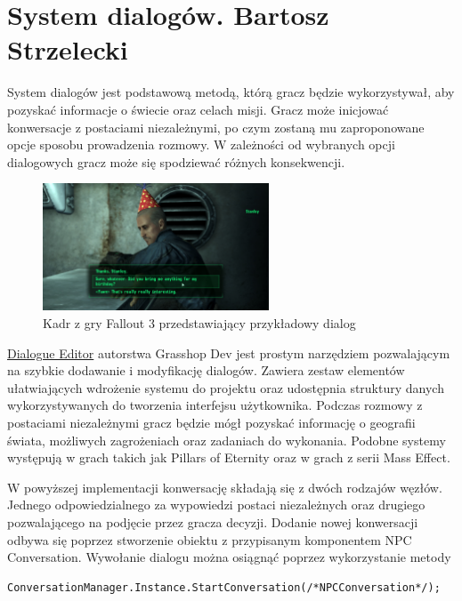 \section{System dialogów. Bartosz Strzelecki}

System dialogów jest podstawową metodą, którą gracz będzie wykorzystywał, aby pozyskać informacje  o świecie oraz celach misji.
Gracz może inicjować konwersacje z postaciami niezależnymi, po czym zostaną mu zaproponowane opcje sposobu prowadzenia rozmowy.
W zależności od wybranych opcji dialogowych gracz może się spodziewać różnych konsekwencji.


\begin{figure}[h]
\centering
\includegraphics[width=0.6\textwidth]{images/fallout3}
\caption{Kadr z gry Fallout 3 przedstawiający przykładowy dialog}
\end{figure}

\href{https://assetstore.unity.com/packages/tools/utilities/dialogue-editor-168329}{Dialogue Editor} autorstwa Grasshop Dev jest prostym narzędziem pozwalającym na szybkie dodawanie i modyfikację dialogów.
Zawiera zestaw elementów ułatwiających wdrożenie systemu do projektu oraz udostępnia struktury danych wykorzystywanych do tworzenia interfejsu użytkownika.
Podczas rozmowy z postaciami niezależnymi gracz będzie mógł pozyskać informację o geografii świata, możliwych zagrożeniach oraz zadaniach do wykonania. 
Podobne systemy występują w grach takich jak Pillars of Eternity oraz w grach z serii Mass Effect.

W powyższej implementacji konwersację składają się z dwóch rodzajów węzłów. Jednego odpowiedzialnego za wypowiedzi postaci niezależnych oraz drugiego
pozwalającego na podjęcie przez gracza decyzji.
Dodanie nowej konwersacji odbywa się poprzez stworzenie obiektu z przypisanym komponentem NPC Conversation.
Wywołanie dialogu można osiągnąć poprzez wykorzystanie metody


\begin{verbatim}
ConversationManager.Instance.StartConversation(/*NPCConversation*/);
\end{verbatim}

